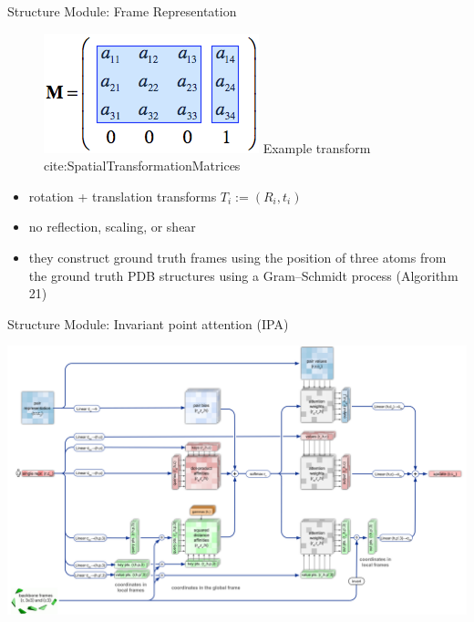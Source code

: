 \documentclass[presentation, smaller]{beamer}
\begin{document}
\begin{frame}[label={sec:org198ee23}]{Structure Module: Frame Representation}
\begin{figure}[htbp]
\centering
\includegraphics[width=.9\linewidth]{./imgs/TransformationMatrix1.png}
{Example transform cite:SpatialTransformationMatrices}
\end{figure}

\begin{itemize}
\item rotation + translation transforms \(T_i := (R_i,t_i)\)
\item no reflection, scaling, or shear
\item they construct ground truth frames using the position of three atoms from the ground truth PDB structures using a Gram–Schmidt process (Algorithm 21)
\end{itemize}
\end{frame}
\begin{frame}[label={sec:orgfc0651c}]{Structure Module: Invariant point attention (IPA) \cite{jumperHighlyAccurateProtein2021}}
\begin{center}
\includegraphics[width=.9\linewidth]{./imgs/ipa.png}
\end{center}
\end{frame}
\end{document}
